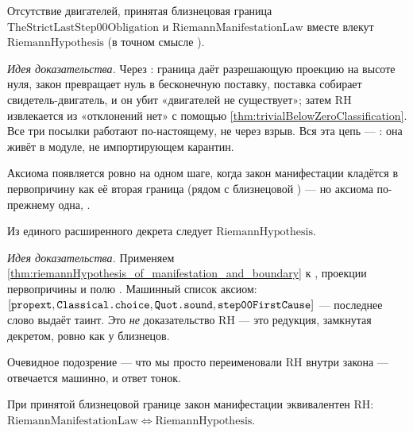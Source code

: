 \begin{theorem}\label{thm:riemannHypothesis_of_manifestation_and_boundary}
Отсутствие двигателей, принятая близнецовая граница $\mathrm{TheStrictLastStep00Obligation}$ и
$\mathrm{RiemannManifestationLaw}$ вместе влекут $\mathrm{RiemannHypothesis}$ (в точном смысле
). \green{}
\end{theorem}

\emph{Идея доказательства.} Через : граница
даёт разрешающую проекцию на высоте нуля, закон превращает нуль в бесконечную поставку, поставка
собирает свидетель-двигатель, и он убит «двигателей не существует»; затем RH извлекается из
«отклонений нет» с помощью \cref{thm:trivialBelowZeroClassification}. Все три посылки работают
по-настоящему, не через взрыв. Вся эта цепь --- \green{}: она живёт в модуле, не импортирующем
карантин.

Аксиома появляется ровно на одном шаге, когда закон манифестации кладётся в первопричину как её
вторая граница  (рядом с близнецовой ) --- но аксиома
по-прежнему одна, \axiom{}.

\begin{theorem}\label{thm:riemannHypothesis_from_firstCause}
Из единого расширенного декрета следует $\mathrm{RiemannHypothesis}$. \yellow{}
\end{theorem}

\emph{Идея доказательства.} Применяем \cref{thm:riemannHypothesis_of_manifestation_and_boundary} к
, проекции первопричины  и полю
. Машинный список аксиом:
$[\texttt{propext}, \texttt{Classical.choice}, \texttt{Quot.sound}, \texttt{step00FirstCause}{}]$ --- последнее слово выдаёт
таинт. Это \emph{не} доказательство RH --- это редукция, замкнутая декретом, ровно как у близнецов.

Очевидное подозрение --- что мы просто переименовали RH внутри закона --- отвечается машинно, и ответ
тонок.

\begin{theorem}\label{thm:riemannManifestation_asserts_RH}
При принятой близнецовой границе закон манифестации эквивалентен RH:
$\mathrm{RiemannManifestationLaw} \iff \mathrm{RiemannHypothesis}$. \yellow{}
\end{theorem}

